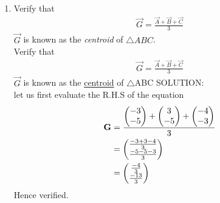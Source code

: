\documentclass[11pt]{book}
\begin{document}
\begin{enumerate}[label=\thesection.\arabic*.,ref=\thesection.\theenumi]
\item Verify that 
		\begin{align}
			\vec{G}=\frac{\vec{A}+\vec{B}+\vec{C}}{3}
		\end{align}
$\vec{G}$ is known as the {\em centroid} of $\triangle ABC$.\\
Verify that\\
\begin{align}
 \vec{G}=\frac{\vec{A}+\vec{B}+\vec{C}}{3}   
\end{align}
$\vec{G}$ is known as the \underline{centroid} of $\triangle$ABC 
SOLUTION:\\
let us first evaluate the R.H.S of the equation
\begin{equation}
\begin{split}
\label{eq:centroid}
    \vec{G}&= \frac{\myvec{-3\\-5}+\myvec{3\\-5}+\myvec{-4\\-3}}{3}\\    
    &= \myvec{\frac{-3+3-4}{3} \\ \frac{-5-5-3}{3}}\\
     &= \myvec{\frac{-4}{3}\\ \frac{-13}{3}}
\end{split}
\end{equation}
Hence verified.



\end{enumerate}
\end{document}
